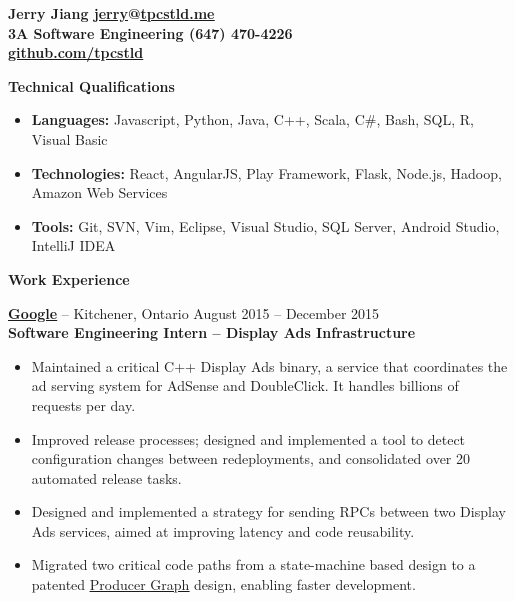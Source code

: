 \documentclass{letter}
\begin{document}
  \thispagestyle{empty}


{\bfseries
  {\Large Jerry Jiang} \hfill \href{mailto:jerry@tpcstld.me}{\uline{jerry}}@\href{http://tpcstld.me}{\uline{tpcstld.me}} \\
  3A Software Engineering \hfill (647) 470-4226 \\
\null \hfill \href{https://github.com/tpcstld}{\uline{github.com/tpcstld}}} \\
\null \hrulefill

{\bfseries \Large Technical Qualifications}
\vspace{-3mm}
\begin{itemize}
    \item {\bfseries Languages:}
        Javascript, Python, Java, C++, Scala, C\#, Bash, SQL, R, Visual Basic
    \item {\bfseries Technologies:}
        React, AngularJS, Play Framework, Flask, Node.js, Hadoop, Amazon Web Services
    \item {\bfseries Tools:}
        Git, SVN, Vim, Eclipse, Visual Studio, SQL Server, Android Studio,
        IntelliJ IDEA
\end{itemize}

{\bfseries \Large Work Experience}

\vspace{-1.5mm}
{\bfseries \href{https://www.google.com}{\uline{Google}}} -- Kitchener, Ontario \hfill August 2015 -- December 2015\\
{\bfseries Software Engineering Intern -- Display Ads Infrastructure}
\vspace{-3mm}
\begin{itemize}
    \item Maintained a critical C++ Display Ads binary, a service that
      coordinates the ad serving system for AdSense and DoubleClick. It handles
      billions of requests per day.
    \item Improved release processes; designed and implemented a tool to detect
      configuration changes between redeployments, and consolidated over 20
      automated release tasks.
    \item Designed and implemented a strategy for sending RPCs between two
      Display Ads services, aimed at improving latency and code reusability.
    \item Migrated two critical code paths from a state-machine based design to
      a patented \href{http://www.google.com/patents/US8191052}
      {\uline {Producer Graph}} design, enabling faster development.
\end{itemize}
\end{document}
